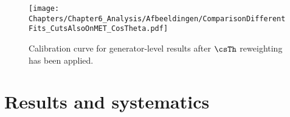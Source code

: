 \begin{figure}[h!t]
 \centering
 \texttt{[image: Chapters/Chapter6\_Analysis/Afbeeldingen/ComparisonDifferentFits\_CutsAlsoOnMET\_CosTheta.pdf]}
 \caption{Calibration curve for generator-level results after $\csTh$ reweighting has been applied.} \label{fig::CalibCurveCos}
\end{figure}
\section{Results and systematics} \label{sec::Results}

